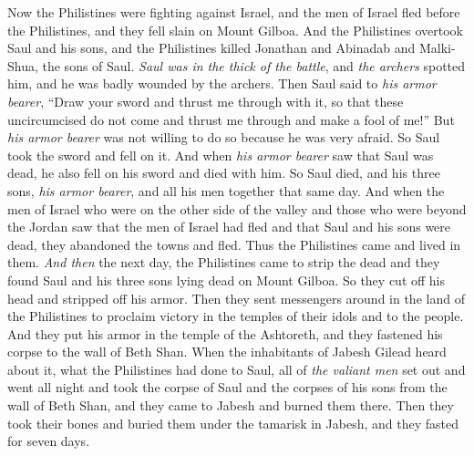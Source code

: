 \begin{biblechapter} %
 Now the Philistines were fighting against Israel, and the men of Israel fled before the Philistines, and they fell slain on Mount Gilboa.
\verse And the Philistines overtook Saul and his sons, and the Philistines killed Jonathan and Abinadab and Malki-Shua, the sons of Saul.
\verse \textit{Saul was in the thick of the battle}, and \textit{the archers} spotted him, and he was badly wounded by the archers.
\verse Then Saul said to \textit{his armor bearer}, “Draw your sword and thrust me through with it, so that these uncircumcised do not come and thrust me through and make a fool of me!” But \textit{his armor bearer} was not willing to do so because he was very afraid. So Saul took the sword and fell on it.
\verse And when \textit{his armor bearer} saw that Saul was dead, he also fell on his sword and died with him.
\verse So Saul died, and his three sons, \textit{his armor bearer}, and all his men together that same day.
\verse And when the men of Israel who were on the other side of the valley and those who were beyond the Jordan saw that the men of Israel had fled and that Saul and his sons were dead, they abandoned the towns and fled. Thus the Philistines came and lived in them.
\verse \textit{And then} the next day, the Philistines came to strip the dead and they found Saul and his three sons lying dead on Mount Gilboa.
\verse So they cut off his head and stripped off his armor. Then they sent messengers around in the land of the Philistines to proclaim victory in the temples of their idols and to the people.
\verse And they put his armor in the temple of the Ashtoreth, and they fastened his corpse to the wall of Beth Shan.
\verse When the inhabitants of Jabesh Gilead heard about it, what the Philistines had done to Saul,
\verse all of \textit{the valiant men} set out and went all night and took the corpse of Saul and the corpses of his sons from the wall of Beth Shan, and they came to Jabesh and burned them there.
\verse Then they took their bones and buried them under the tamarisk in Jabesh, and they fasted for seven days.
\end{biblechapter}


